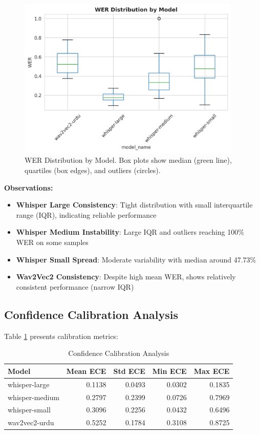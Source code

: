 \begin{figure}[H]
    \centering
    \includegraphics[width=0.95\textwidth]{ThesisFigs/wer_distribution.png}
    \caption{WER Distribution by Model. Box plots show median (green line), quartiles (box edges), and outliers (circles).}
    \label{fig:wer_distribution}
\end{figure}

\textbf{Observations:}

\begin{itemize}
    \item \textbf{Whisper Large Consistency}: Tight distribution with small interquartile range (IQR), indicating reliable performance
    \item \textbf{Whisper Medium Instability}: Large IQR and outliers reaching 100\% WER on some samples
    \item \textbf{Whisper Small Spread}: Moderate variability with median around 47.73\%
    \item \textbf{Wav2Vec2 Consistency}: Despite high mean WER, shows relatively consistent performance (narrow IQR)
\end{itemize}

\subsection{Confidence Calibration Analysis}

Table \ref{tab:calibration} presents calibration metrics:

\begin{table}[H]
\centering
\caption{Confidence Calibration Analysis}
\label{tab:calibration}
\begin{tabular}{lrrrr}
\toprule
\textbf{Model} & \textbf{Mean ECE} & \textbf{Std ECE} & \textbf{Min ECE} & \textbf{Max ECE} \\
\midrule
whisper-large  & 0.1138 & 0.0493 & 0.0302 & 0.1835 \\
whisper-medium & 0.2797 & 0.2399 & 0.0726 & 0.7969 \\
whisper-small  & 0.3096 & 0.2256 & 0.0432 & 0.6496 \\
wav2vec2-urdu  & 0.5252 & 0.1784 & 0.3108 & 0.8725 \\
\bottomrule
\end{tabular}
\end{table}

